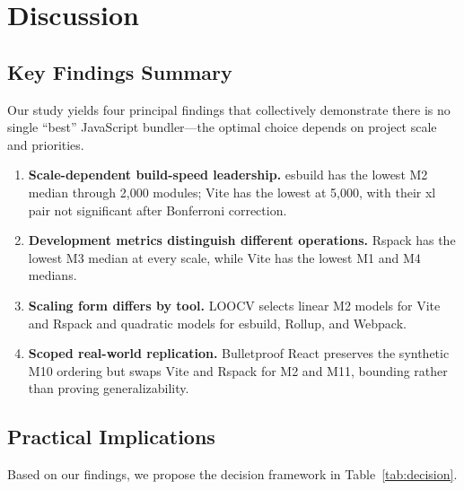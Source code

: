 \documentclass[preprint,12pt]{elsarticle}
\begin{document}
\section{Discussion}\label{sec:discussion}

\subsection{Key Findings Summary}\label{sec:findings}

Our study yields four principal findings that collectively demonstrate there is no single ``best'' JavaScript bundler---the optimal choice depends on project scale and priorities.

\begin{enumerate}[leftmargin=*,label=\textbf{F\arabic*.}]
  \item \textbf{Scale-dependent build-speed leadership.} esbuild has the lowest M2 median through 2{,}000 modules; Vite has the lowest at 5{,}000, with their xl pair not significant after Bonferroni correction.
  \item \textbf{Development metrics distinguish different operations.} Rspack has the lowest M3 median at every scale, while Vite has the lowest M1 and M4 medians.
  \item \textbf{Scaling form differs by tool.} LOOCV selects linear M2 models for Vite and Rspack and quadratic models for esbuild, Rollup, and Webpack.
  \item \textbf{Scoped real-world replication.} Bulletproof React preserves the synthetic M10 ordering but swaps Vite and Rspack for M2 and M11, bounding rather than proving generalizability.
\end{enumerate}

\subsection{Practical Implications}\label{sec:practical}

Based on our findings, we propose the decision framework in Table~\ref{tab:decision}.
\end{document}
